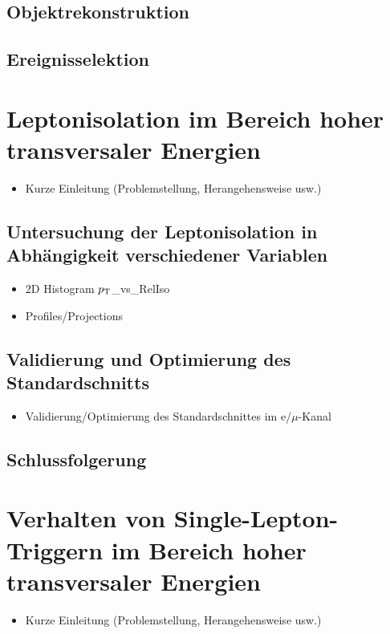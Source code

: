 \documentclass[12pt,a4paper]{article}
\newcommand{\pt}{$p_{\text T}$}
\begin{document}
\subsection{Objektrekonstruktion}
\subsection{Ereignisselektion}
\section{Leptonisolation im Bereich hoher transversaler Energien}
\begin{itemize}
\item Kurze Einleitung (Problemstellung, Herangehensweise usw.)
\end{itemize}
\subsection{Untersuchung der Leptonisolation in Abhängigkeit verschiedener Variablen}
\begin{itemize}
\item 2D Histogram \pt \_vs\_RelIso
\item Profiles/Projections
\end{itemize}
\subsection{Validierung und Optimierung des Standardschnitts}
\begin{itemize}

\item Validierung/Optimierung des Standardschnittes im e/$\mu$-Kanal
\end{itemize}
\subsection{Schlussfolgerung}
\section{Verhalten von Single-Lepton-Triggern im Bereich hoher transversaler Energien}
\begin{itemize}
\item Kurze Einleitung (Problemstellung, Herangehensweise usw.)
\end{itemize}
\end{document}
